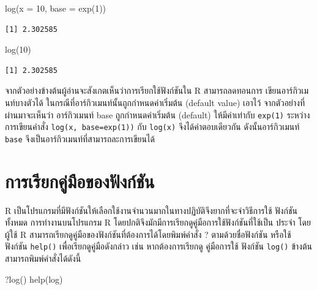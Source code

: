 \documentclass[
  a4paper,
]{book}
\newenvironment{Shaded}{\begin{snugshade}}{\end{snugshade}}
\newcommand{\AttributeTok}[1]{\textcolor[rgb]{0.40,0.45,0.13}{#1}}
\newcommand{\DecValTok}[1]{\textcolor[rgb]{0.68,0.00,0.00}{#1}}
\newcommand{\FunctionTok}[1]{\textcolor[rgb]{0.28,0.35,0.67}{#1}}
\newcommand{\NormalTok}[1]{\textcolor[rgb]{0.00,0.23,0.31}{#1}}
\begin{document}
\begin{Shaded}
\begin{Highlighting}[]
\FunctionTok{log}\NormalTok{(}\AttributeTok{x =} \DecValTok{10}\NormalTok{, }\AttributeTok{base =} \FunctionTok{exp}\NormalTok{(}\DecValTok{1}\NormalTok{))}
\end{Highlighting}
\end{Shaded}

\begin{verbatim}
[1] 2.302585
\end{verbatim}

\begin{Shaded}
\begin{Highlighting}[]
\FunctionTok{log}\NormalTok{(}\DecValTok{10}\NormalTok{)}
\end{Highlighting}
\end{Shaded}

\begin{verbatim}
[1] 2.302585
\end{verbatim}

จากตัวอย่างข้างต้นผู้อ่านจะสังเกตเห็นว่าการเรียกใช้ฟังก์ชันใน R สามารถลดทอนการ
เขียนอาร์กิวเมนท์บางตัวได้ ในกรณีที่อาร์กิวเมนท์นั้นถูกกำหนดค่าเริ่มต้น (default value)
เอาไว้ จากตัวอย่างที่ผ่านมาจะเห็นว่า อาร์กิวเมนท์ base ถูกกำหนดค่าเริ่มต้น (default)
ให้มีค่าเท่ากับ \texttt{exp(1)} ระหว่างการเขียนคำสั่ง
\texttt{log(x,\ base=exp(1))} กับ \texttt{log(x)} จึงได้คำตอบเดียวกัน
ดังนั้นอาร์กิวเมนท์ \texttt{base} จึงเป็นอาร์กิวเมนท์ที่สามารถละการเขียนได้

\section{การเรียกคู่มือของฟังก์ชัน}\label{uxe01uxe32uxe23uxe40uxe23uxe22uxe01uxe04uxe21uxe2duxe02uxe2duxe07uxe1fuxe07uxe01uxe0auxe19}

R เป็นโปรแกรมที่มีฟังก์ชันให้เลือกใช้งานจำนวนมากในทางปฏิบัติจึงยากที่จะจำวิธีการใช้
ฟังก์ชันทั้งหมด การทำงานบนโปรแกรม R โดยปกติจึงมักมีการเรียกดูคู่มือการใช้ฟังก์ชันที่ใช้เป็น
ประจำ โดยผู้ใช้ R สามารถเรียกดูคู่มือของฟังก์ชันที่ต้องการได้โดยพิมพ์คำสั่ง ? ตามด้วยชื่อฟังก์ชัน
หรือใช้ฟังก์ชัน \texttt{help()} เพื่อเรียกดูคู่มือดังกล่าว เช่น หากต้องการเรียกดู คู่มือการใช้
ฟังก์ชัน \texttt{log()} ข้างต้นสามารถพิมพ์คำสั่งได้ดังนี้

\begin{Shaded}
\begin{Highlighting}[]
\NormalTok{?}\FunctionTok{log}\NormalTok{()}
\FunctionTok{help}\NormalTok{(log)}
\end{Highlighting}
\end{Shaded}
\end{document}
